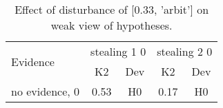 \begin{table}\begin{tabular}{l|cc|cc}\toprule\multirow{2}{*}{Evidence} & \multicolumn{2}{c}{stealing 1 0}& \multicolumn{2}{c}{stealing 2 0}\\& {K2} & {Dev}& {K2} & {Dev}\\\midrule
no evidence, 0 & \cellcolor{Bittersweet}0.53&\cellcolor{Bittersweet}H0&\cellcolor{Bittersweet}0.17&\cellcolor{Bittersweet}H0\\\bottomrule\end{tabular}\caption{Effect of disturbance of [0.33, 'arbit'] on weak view of hypotheses.}\end{table}